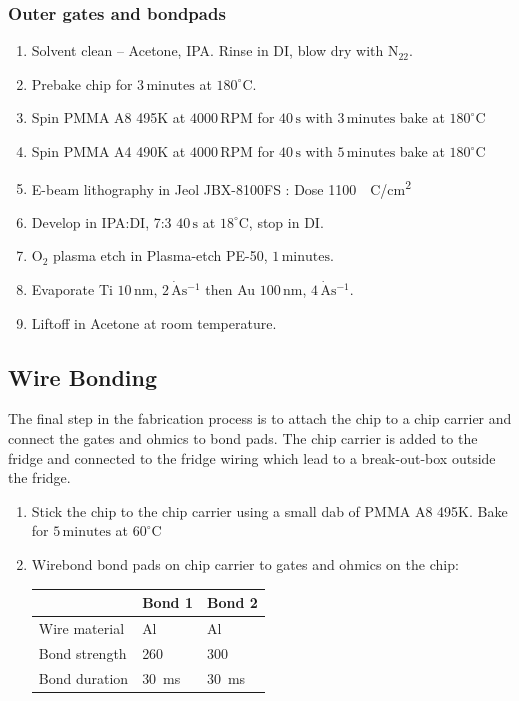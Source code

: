 \subsubsection{Outer gates and bondpads }

\begin{enumerate}
\item Solvent clean – Acetone, IPA. Rinse in DI, blow dry with $\mathrm{N_22}$.
\item Prebake chip for $3\,\mathrm{minutes}$ at $180^\circ$C.
\item Spin PMMA A8 495K at $4000\,\mathrm{RPM}$ for $40\,\mathrm{s}$  with $3\,\mathrm{minutes}$ bake at $180^\circ$C
\item Spin PMMA A4 490K at $4000\,\mathrm{RPM}$ for $40\,\mathrm{s}$  with $5\,\mathrm{minutes}$ bake at $180^\circ$C
\item E-beam lithography in Jeol JBX-8100FS : Dose \qty{1100}{\mu C/cm^2}
\item Develop in IPA:DI, 7:3 $40\,\mathrm{s}$ at $18^\circ$C, stop in DI.
\item $\mathrm{O_2}$ plasma etch in Plasma-etch PE-50, $1\,\mathrm{minutes}$.
\item Evaporate Ti $10\,\mathrm{nm}$, $2\,\mathrm{\dot{A}s^{-1}}$ then Au $100\,\mathrm{nm}$, $4\,\mathrm{\dot{A}s^{-1}}$.
\item Liftoff in Acetone at room temperature.
\end{enumerate}




\subsection{Wire Bonding}

The final step in the fabrication process is to attach the chip to a chip carrier and connect the gates and ohmics to bond pads. The chip carrier is added to the fridge and connected to the fridge wiring which lead to a break-out-box outside the fridge. 


\begin{enumerate}

\item Stick the chip to the chip carrier using a small dab of PMMA A8 495K. Bake for $5\,\mathrm{minutes}$ at $60^\circ$C
\item Wirebond bond pads on chip carrier to gates and ohmics on the chip:
\begin{table}[H]     
\centering
  \begin{tabular}{|p{3.0cm}|p{2.0cm}|p{2.0cm}|}
    \hline
     & Bond 1 & Bond 2\\
    \hline
    Wire material & Al & Al\\
    Bond strength & 260 & 300\\
    Bond duration & \qty{30}{ms} & \qty{30}{ms} \\
    \hline
  \end{tabular}
\label{tab:wire_bonding}
\end{table}
\end{enumerate}